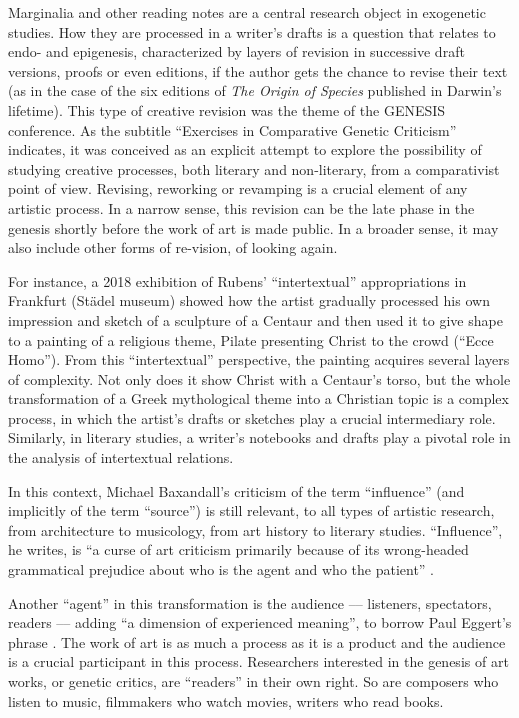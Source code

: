 \begin{preface}
Marginalia and other reading notes are a central research object in
exogenetic studies. How they are processed in a writer's drafts is a
question that relates to endo- and epigenesis, characterized by layers
of revision in successive draft versions, proofs or even editions, if
the author gets the chance to revise their text (as in the case of the
six editions of \emph{The Origin of Species} published in Darwin's
lifetime). This type of creative revision was the theme of the GENESIS
conference. As the subtitle ``Exercises in Comparative Genetic Criticism''
indicates, it was conceived as an explicit attempt to explore the
possibility of studying creative processes, both literary and
non-literary, from a comparativist point of view. Revising, reworking or
revamping is a crucial element of any artistic process. In a narrow
sense, this revision can be the late phase in the genesis shortly before
the work of art is made public. In a broader sense, it may also include
other forms of re-vision, of looking again.

For instance, a 2018 exhibition of Rubens' ``intertextual''
appropriations in Frankfurt (Städel museum) showed how the artist
gradually processed his own impression and sketch of a sculpture of a
Centaur and then used it to give shape to a painting of a religious
theme, Pilate presenting Christ to the crowd (``Ecce Homo''). From this
``intertextual'' perspective, the painting acquires several layers of
complexity. Not only does it show Christ with a Centaur's torso, but the
whole transformation of a Greek mythological theme into a Christian
topic is a complex process, in which the artist's drafts or sketches
play a crucial intermediary role. Similarly, in literary studies, a
writer's notebooks and drafts play a pivotal role in the analysis of
intertextual relations.

In this context, Michael Baxandall's criticism of the term ``influence''
(and implicitly of the term ``source'') is still relevant, to all types of
artistic research, from architecture to musicology, from art history to
literary studies. ``Influence'', he writes, is ``a curse of art criticism
primarily because of its wrong-headed grammatical prejudice about who is
the agent and who the patient'' \parencite[58]{baxandall_patterns_1985}.

Another ``agent'' in this transformation is the audience –– listeners,
spectators, readers –– adding ``a dimension of experienced meaning'', to
borrow Paul Eggert's phrase \parencite[173]{eggert_work_2019}. The work of art is as much a process as it
is a product and the audience is a crucial participant in this process.
Researchers interested in the genesis of art works, or genetic critics,
are ``readers'' in their own right. So are composers who listen to music,
filmmakers who watch movies, writers who read books.


\end{preface}
